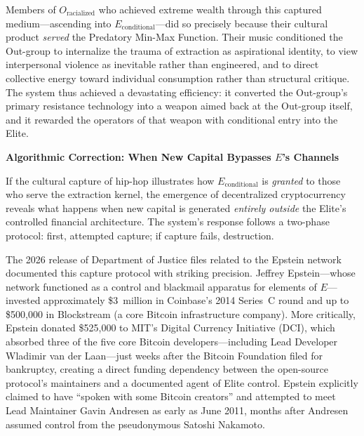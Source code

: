 \documentclass[12pt,openany]{book}
\begin{document}
Members of $O_{\text{racialized}}$ who achieved extreme wealth through this captured medium---ascending into $E_{\text{conditional}}$---did so precisely because their cultural product \textit{served} the Predatory Min-Max Function. Their music conditioned the Out-group to internalize the trauma of extraction as aspirational identity, to view interpersonal violence as inevitable rather than engineered, and to direct collective energy toward individual consumption rather than structural critique. The system thus achieved a devastating efficiency: it converted the Out-group's primary resistance technology into a weapon aimed back at the Out-group itself, and it rewarded the operators of that weapon with conditional entry into the Elite.

\textbf{Algorithmic Correction: When New Capital Bypasses $E$'s Channels}

If the cultural capture of hip-hop illustrates how $E_{\text{conditional}}$ is \textit{granted} to those who serve the extraction kernel, the emergence of decentralized cryptocurrency reveals what happens when new capital is generated \textit{entirely outside} the Elite's controlled financial architecture. The system's response follows a two-phase protocol: first, attempted capture; if capture fails, destruction.

The 2026 release of Department of Justice files related to the Epstein network documented this capture protocol with striking precision. Jeffrey Epstein---whose network functioned as a control and blackmail apparatus for elements of $E$---invested approximately \$3~million in Coinbase's 2014 Series~C round and up to \$500,000 in Blockstream (a core Bitcoin infrastructure company). More critically, Epstein donated \$525,000 to MIT's Digital Currency Initiative (DCI), which absorbed three of the five core Bitcoin developers---including Lead Developer Wladimir van der Laan---just weeks after the Bitcoin Foundation filed for bankruptcy, creating a direct funding dependency between the open-source protocol's maintainers and a documented agent of Elite control. Epstein explicitly claimed to have ``spoken with some Bitcoin creators'' and attempted to meet Lead Maintainer Gavin Andresen as early as June 2011, months after Andresen assumed control from the pseudonymous Satoshi Nakamoto.
\end{document}

